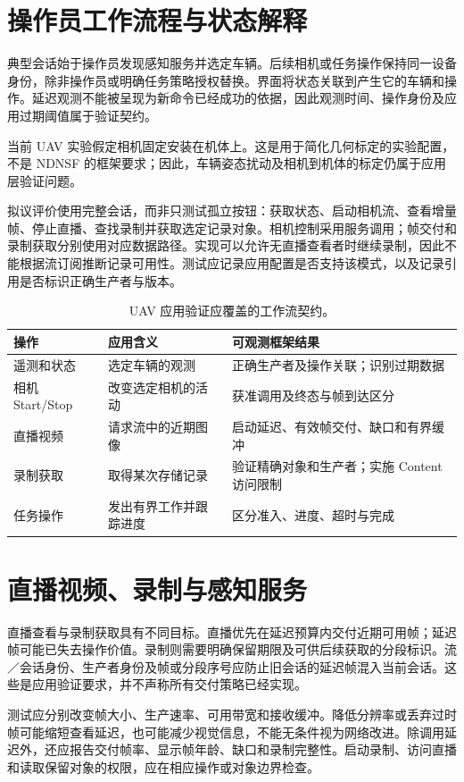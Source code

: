 \section{操作员工作流程与状态解释}
典型会话始于操作员发现感知服务并选定车辆。后续相机或任务操作保持同一设备身份，除非操作员或明确任务策略授权替换。界面将状态关联到产生它的车辆和操作。延迟观测不能被呈现为新命令已经成功的依据，因此观测时间、操作身份及应用过期阈值属于验证契约。

当前 UAV 实验假定相机固定安装在机体上。这是用于简化几何标定的实验配置，不是 NDNSF 的框架要求；因此，车辆姿态扰动及相机到机体的标定仍属于应用层验证问题。

拟议评价使用完整会话，而非只测试孤立按钮：获取状态、启动相机流、查看增量帧、停止直播、查找录制并获取选定记录对象。相机控制采用服务调用；帧交付和录制获取分别使用对应数据路径。实现可以允许无直播查看者时继续录制，因此不能根据流订阅推断记录可用性。测试应记录应用配置是否支持该模式，以及记录引用是否标识正确生产者与版本。

\begin{table}[htbp]\centering\small
\caption{UAV 应用验证应覆盖的工作流契约。}
\begin{tabularx}{\textwidth}{p{}XX}
\toprule 操作 & 应用含义 & 可观测框架结果\\\midrule
遥测和状态 & 选定车辆的观测 & 正确生产者及操作关联；识别过期数据\\\midrule
相机 Start/Stop & 改变选定相机的活动 & 获准调用及终态与帧到达区分\\\midrule
直播视频 & 请求流中的近期图像 & 启动延迟、有效帧交付、缺口和有界缓冲\\\midrule
录制获取 & 取得某次存储记录 & 验证精确对象和生产者；实施 Content 访问限制\\\midrule
任务操作 & 发出有界工作并跟踪进度 & 区分准入、进度、超时与完成\\\bottomrule
\end{tabularx}
\end{table}

\section{直播视频、录制与感知服务}
直播查看与录制获取具有不同目标。直播优先在延迟预算内交付近期可用帧；延迟帧可能已失去操作价值。录制则需要明确保留期限及可供后续获取的分段标识。流／会话身份、生产者身份及帧或分段序号应防止旧会话的延迟帧混入当前会话。这些是应用验证要求，并不声称所有交付策略已经实现。

测试应分别改变帧大小、生产速率、可用带宽和接收缓冲。降低分辨率或丢弃过时帧可能缩短查看延迟，也可能减少视觉信息，不能无条件视为网络改进。除调用延迟外，还应报告交付帧率、显示帧年龄、缺口和录制完整性。启动录制、访问直播和读取保留对象的权限，应在相应操作或对象边界检查。

